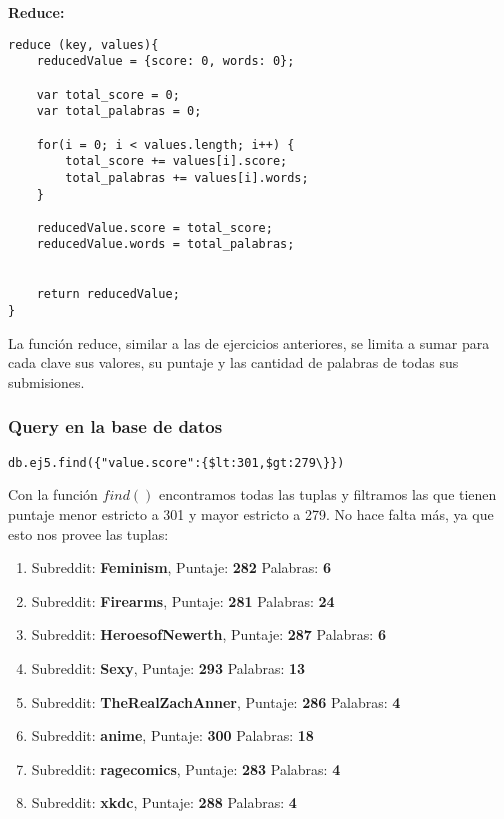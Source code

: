 \vspace{2mm}

\textbf{Reduce:}

\begin{lstlisting}
reduce (key, values){
    reducedValue = {score: 0, words: 0};

	var total_score = 0;
	var total_palabras = 0;

	for(i = 0; i < values.length; i++) {
		total_score += values[i].score;
		total_palabras += values[i].words;
	}

	reducedValue.score = total_score;
	reducedValue.words = total_palabras;


    return reducedValue;
}

\end{lstlisting}

La funci\'on reduce, similar a las de ejercicios anteriores, se limita a sumar para cada clave sus valores, su puntaje y las cantidad de palabras de todas sus submisiones.

\vspace{2mm}

\subsubsection{Query en la base de datos}

\begin{lstlisting}
db.ej5.find({"value.score":{$lt:301,$gt:279\}})
\end{lstlisting}

Con la funci\'on $find()$ encontramos todas las tuplas y filtramos las que tienen puntaje menor estricto a 301 y mayor estricto a 279. No hace falta m\'as, ya que esto nos provee las tuplas:

\begin{enumerate}

\item Subreddit: \textbf{Feminism}, Puntaje: \textbf{282} Palabras: \textbf{6}
\item Subreddit: \textbf{Firearms}, Puntaje: \textbf{281} Palabras: \textbf{24}
\item Subreddit: \textbf{HeroesofNewerth}, Puntaje: \textbf{287} Palabras: \textbf{6}
\item Subreddit: \textbf{Sexy}, Puntaje: \textbf{293} Palabras: \textbf{13}
\item Subreddit: \textbf{TheRealZachAnner}, Puntaje: \textbf{286} Palabras: \textbf{4}
\item Subreddit: \textbf{anime}, Puntaje: \textbf{300} Palabras: \textbf{18}
\item Subreddit: \textbf{ragecomics}, Puntaje: \textbf{283} Palabras: \textbf{4}
\item Subreddit: \textbf{xkdc}, Puntaje: \textbf{288} Palabras: \textbf{4}

\end{enumerate}